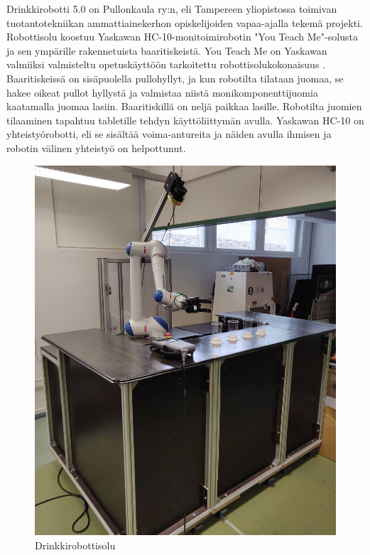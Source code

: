 Drinkkirobotti 5.0 on Pullonkaula ry:n, eli Tampereen yliopistossa toimivan tuotantotekniikan ammattiainekerhon opiskelijoiden vapaa-ajalla tekemä projekti. Robottisolu koostuu Yaskawan HC-10-monitoimirobotin "You Teach Me"\hyp{}solusta ja sen ympärille rakennetuista baaritiskeistä. You Teach Me on Yaskawan valmiiksi valmisteltu opetuskäyttöön tarkoitettu robottisolukokonaisuus \cite{Yaskawa2017}. Baaritiskeissä on sisäpuolella pullohyllyt, ja kun robotilta tilataan juomaa, se hakee oikeat pullot hyllystä ja valmistaa niistä monikomponenttijuomia kaatamalla juomaa lasiin. Baaritiskillä on neljä paikkaa lasille. Robotilta juomien tilaaminen tapahtuu tabletille tehdyn käyttöliittymän avulla. Yaskawan HC-10 on yhteistyörobotti, eli se sisältää voima-antureita ja näiden avulla ihmisen ja robotin välinen yhteistyö on helpottunut. \cite{Pullonkaula2020}

\begin{figure}[h]
\begin{center}
\includegraphics[scale=0.075]{img/drinkkirobotti.jpg}   %
\end{center}
\caption{Drinkkirobottisolu}
\label{fig:drinkkirobotti}
\end{figure}

